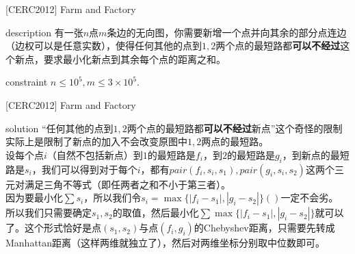 \documentclass{beamer}
\def\le{\leqslant}
\begin{document}
\begin{frame}{[CERC2012] Farm and Factory}
	\begin{block}{description}
		有一张$n$点$m$条边的无向图，你需要新增一个点并向其余的部分点连边（边权可以是任意实数），使得任何其他的点到$1, 2$两个点的最短路都\textbf{可以不经过}这个新点，要求最小化新点到其余每个点的距离之和。
	\end{block}
	\begin{block}{constraint}
		$n \le 10^5, m \le 3 \times 10^5.$
	\end{block}
\end{frame}
\begin{frame}{[CERC2012] Farm and Factory}
	\begin{block}{solution}
		“任何其他的点到$1, 2$两个点的最短路都\textbf{可以不经过}新点”这个奇怪的限制实际上是限制了新点的加入不会改变原图中$1, 2$两点的最短路。\\
		
		设每个点$i$（自然不包括新点）到$1$的最短路是$f_i$，到$2$的最短路是$g_i$，到新点的最短路是$s_i$，我们可以得到对于每个$i$，都有$pair(f_i, s_i, s_1), pair(g_i, s_i, s_2)$这两个三元对满足三角不等式（即任两者之和不小于第三者）。\\
		
		因为要最小化$\sum s_i$，所以我们令$s_i = \max\{|f_i - s_1|, |g_i - s_2|\}()$一定不会劣。\\
		
		所以我们只需要确定$s_1, s_2$的取值，然后最小化$\sum \max\{|f_i - s_1|, |g_i - s_2|\}$就可以了。这个形式恰好是点$(s_1, s_2)$与点$(f_i, g_i)$的Chebyshev距离，只需要先转成Manhattan距离（这样两维就独立了），然后对两维坐标分别取中位数即可。
	\end{block}
\end{frame}
\end{document}
